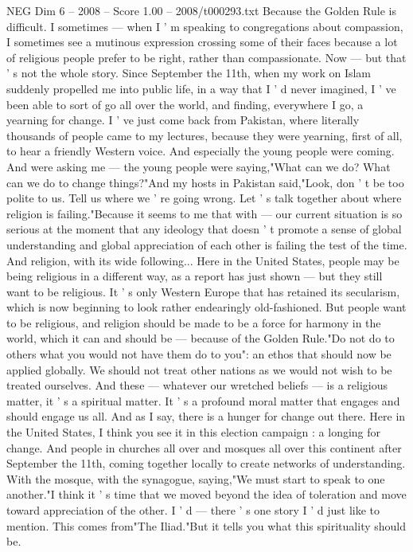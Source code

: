 \begin{textsample}{NEG Dim 6 – 2008 – Score 1.00 – 2008/t000293.txt}
Because the Golden Rule is difficult.
I sometimes — when I ' m speaking to congregations about compassion, I sometimes see a mutinous expression crossing some of their faces because a lot of religious people prefer to be right, rather than compassionate.
Now — but that ' s not the whole story.
Since September the 11th, when my work on Islam suddenly propelled me into public life, in a way that I ' d never imagined, I ' ve been able to sort of go all over the world, and finding, everywhere I go, a yearning for change.
I ' ve just come back from Pakistan, where literally thousands of people came to my lectures, because they were yearning, first of all, to hear a friendly Western voice.
And especially the young people were coming.
And were asking me — the young people were saying,"What can we do?
What can we do to change things?"And my hosts in Pakistan said,"Look, don ' t be too polite to us.
Tell us where we ' re going wrong.
Let ' s talk together about where religion is failing."Because it seems to me that with — our current situation is so serious at the moment that any ideology that doesn ' t promote a sense of global understanding and global appreciation of each other is failing the test of the time.
And religion, with its wide following...
Here in the United States, people may be being religious in a different way, as a report has just shown — but they still want to be religious.
It ' s only Western Europe that has retained its secularism, which is now beginning to look rather endearingly old-fashioned.
But people want to be religious, and religion should be made to be a force for harmony in the world, which it can and should be — because of the Golden Rule."Do not do to others what you would not have them do to you": an ethos that should now be applied globally.
We should not treat other nations as we would not wish to be treated ourselves.
And these — whatever our wretched beliefs — is a religious matter, it ' s a spiritual matter.
It ' s a profound moral matter that engages and should engage us all.
And as I say, there is a hunger for change out there.
Here in the United States, I think you see it in this election campaign : a longing for change.
And people in churches all over and mosques all over this continent after September the 11th, coming together locally to create networks of understanding.
With the mosque, with the synagogue, saying,"We must start to speak to one another."I think it ' s time that we moved beyond the idea of toleration and move toward appreciation of the other.
I ' d — there ' s one story I ' d just like to mention.
This comes from"The Iliad."But it tells you what this spirituality should be.

\end{textsample}
